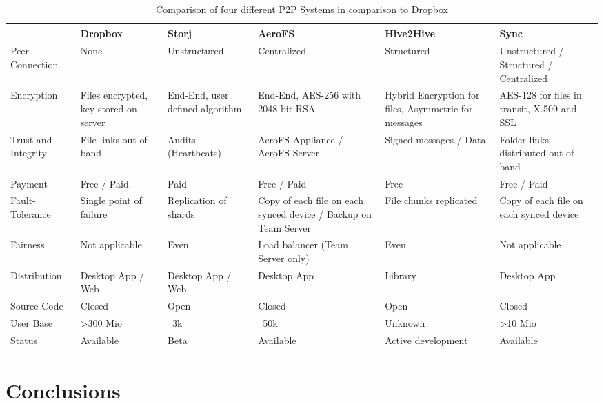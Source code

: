 \begin{table}
	\centering
	\caption{Comparison of four different P2P Systems in comparison to Dropbox}
	\label{table}
		\begin{tabular}{ | *{6}{ p{2.5cm} |} }
			\hline
			& Dropbox & Storj & AeroFS & Hive2Hive & Sync \\ \hline
			Peer Connection & None & Unstructured & Centralized & Structured & Unstructured / Structured / Centralized \\ \hline
			Encryption & Files encrypted, key stored on server & End-End, user defined algorithm & End-End, AES-256 with 2048-bit RSA & Hybrid Encryption for files, Asymmetric for messages & AES-128 for files in transit, X.509 and SSL \\ \hline
			Trust and Integrity & File links out of band & Audits (Heartbeats) & AeroFS Appliance / AeroFS Server & Signed messages / Data & Folder links distributed out of band \\ \hline
			Payment & Free / Paid & Paid & Free / Paid & Free & Free / Paid \\ \hline
			Fault-Tolerance & Single point of failure & Replication of shards & Copy of each file on each synced device / Backup on Team Server & File chunks replicated & Copy of each file on each synced device \\ \hline
			Fairness & Not applicable & Even & Load balancer (Team Server only) & Even & Not applicable \\ \hline
			Distribution & Desktop App / Web & Desktop App / Web & Desktop App & Library & Desktop App \\ \hline
			Source Code & Closed & Open & Closed & Open & Closed \\ \hline
			User Base & >300 Mio & ~3k & ~50k & Unknown & >10 Mio \\ \hline
			Status & Available & Beta & Available & Active development & Available \\ \hline
		\end{tabular}
\end{table}

\section{Conclusions}

